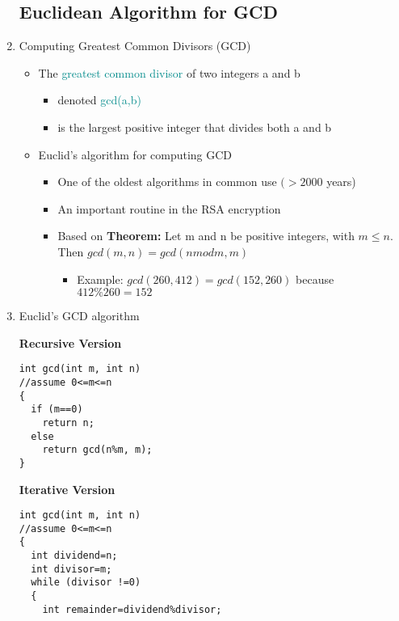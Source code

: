 \begin{enumerate}
\subsection{Euclidean Algorithm for GCD}
\item Computing Greatest Common Divisors (GCD)
  \begin{itemize}
  \item The \textcolor{DarkCyan}{greatest common divisor} of two integers a and b
    \begin{itemize}
    \item denoted \textcolor{DarkCyan}{gcd(a,b)}
    \item is the largest positive integer that divides both a and b
    \end{itemize}
  \item Euclid's algorithm for computing GCD
    \begin{itemize}
    \item One of the oldest algorithms in common use $(>2000$ years)
    \item An important routine in the RSA encryption
    \item Based on \textbf{Theorem:} Let m and n be positive integers, with $m\leq n$. Then $gcd(m,n)=gcd(n mod m,m)$
      \begin{itemize}
      \item Example: $gcd(260,412)=gcd(152,260)$ because $412\%260=152$
      \end{itemize}
    \end{itemize}
  \end{itemize}
\item Euclid's GCD algorithm \\
\noindent\begin{minipage}[t]{0.5\textwidth} %
\textbf{Recursive Version}
\begin{lstlisting}
int gcd(int m, int n)
//assume 0<=m<=n
{
  if (m==0)
    return n;
  else
    return gcd(n%m, m);
}
\end{lstlisting}
\end{minipage}
\begin{minipage}[t]{0.5\textwidth} %
\textbf{Iterative Version}
\begin{lstlisting}
int gcd(int m, int n)
//assume 0<=m<=n
{
  int dividend=n;
  int divisor=m;
  while (divisor !=0)
  {
    int remainder=dividend%divisor;

\end{lstlisting}
\end{minipage}
\end{enumerate}

